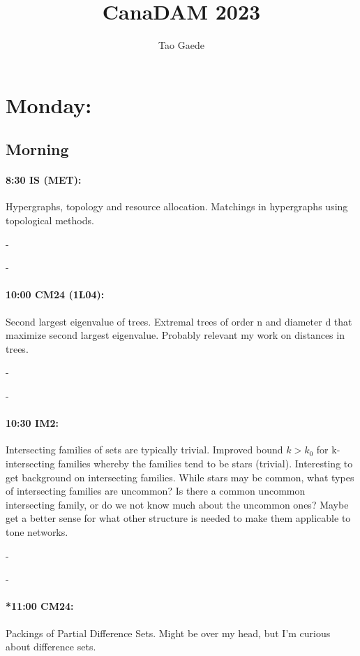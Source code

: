 \documentclass[12]{article}
\title{ \vspace{-3cm} CanaDAM 2023 }
\author{Tao Gaede}
\theoremstyle{definition}
\begin{document}
	\maketitle
	\tableofcontents
	
	\newpage
	\section{Monday:}
	\subsection{Morning}
	
	\paragraph{8:30 IS (MET):} Hypergraphs, topology and resource allocation.
	Matchings in hypergraphs using topological methods.
	
	-
	
	-
	
	\paragraph{10:00 CM24 (1L04):} Second largest eigenvalue of trees.
	Extremal trees of order n and diameter d that maximize second largest eigenvalue.  Probably relevant my work on distances in trees.
	
	-
	
	-
	
	\paragraph{10:30 IM2:} Intersecting families of sets are typically trivial.
	Improved bound $k > k_0$ for k-intersecting families whereby the families tend to be stars (trivial).  Interesting to get background on intersecting families.  While stars may be common, what types of intersecting families are uncommon?  Is there a common uncommon intersecting family, or do we not know much about the uncommon ones?  Maybe get a better sense for what other structure is needed to make them applicable to tone networks.
	
	-
	
	-
	
	\paragraph{*11:00 CM24:} Packings of Partial Difference Sets.
	Might be over my head, but I'm curious about difference sets.
	
\end{document}
